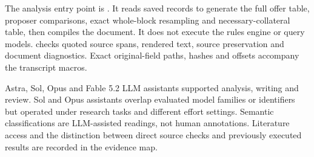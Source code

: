 

The analysis entry point is . It reads saved records to generate the full offer table, proposer comparisons, exact whole-block resampling and necessary-collateral table, then compiles the document. It does not execute the rules engine or query models.  checks quoted source spans, rendered text, source preservation and document diagnostics. Exact original-field paths, hashes and offsets accompany the transcript macros.

Astra, Sol, Opus and Fable 5.2 LLM assistants supported analysis, writing and review. Sol and Opus assistants overlap evaluated model families or identifiers but operated under research tasks and different effort settings. Semantic classifications are LLM-assisted readings, not human annotations. Literature access and the distinction between direct source checks and previously executed results are recorded in the evidence map.
